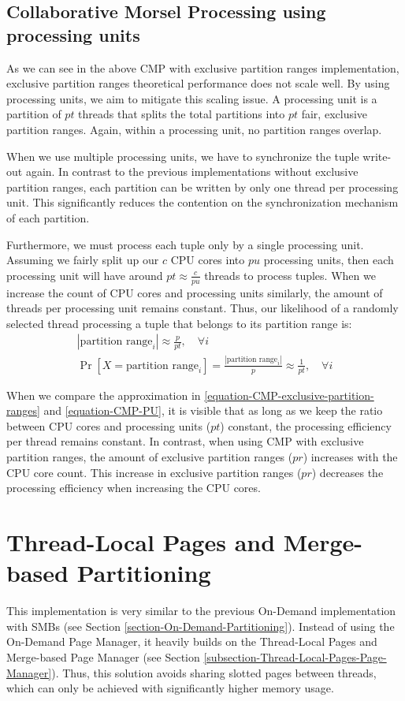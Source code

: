 \subsection{Collaborative Morsel Processing using processing units}
As we can see in the above \ac{CMP} with exclusive partition ranges implementation, exclusive partition ranges theoretical performance does not scale well.
By using processing units, we aim to mitigate this scaling issue.
A processing unit is a partition of $pt$ threads that splits the total partitions into $pt$ fair, exclusive partition ranges.
Again, within a processing unit, no partition ranges overlap.

When we use multiple processing units, we have to synchronize the tuple write-out again.
In contrast to the previous implementations without exclusive partition ranges, each partition can be written by only one thread per processing unit.
This significantly reduces the contention on the synchronization mechanism of each partition.

Furthermore, we must process each tuple only by a single processing unit.
Assuming we fairly split up our $c$ \ac{CPU} cores into $pu$ processing units, then each processing unit will have around $pt\approx\frac{c}{pu}$ threads to process tuples.
When we increase the count of CPU cores and processing units similarly, the amount of threads per processing unit remains constant.
Thus, our likelihood of a randomly selected thread processing a tuple that belongs to its partition range is:
\begin{gather}
  |\textrm{partition range}_i| \approx \frac{p}{pt},  \quad \forall i \\
  \Pr[X=\textrm{partition range}_i] = \frac{|\textrm{partition range}_i|}{p}\approx \frac{1}{pt} ,  \quad \forall i\label{equation-CMP-PU}
\end{gather}

When we compare the approximation in \ref{equation-CMP-exclusive-partition-ranges} and \ref{equation-CMP-PU}, it is visible that as long as we keep the ratio between CPU cores and processing units ($pt$) constant, the processing efficiency per thread remains constant.
In contrast, when using \acl{CMP} with exclusive partition ranges, the amount of exclusive partition ranges ($pr$) increases with the CPU core count.
This increase in exclusive partition ranges ($pr$) decreases the processing efficiency when increasing the CPU cores.

\section{Thread-Local Pages and Merge-based Partitioning}
This implementation is very similar to the previous On-Demand implementation with \aclp{SMB} (see Section \ref{section-On-Demand-Partitioning}).
Instead of using the On-Demand Page Manager, it heavily builds on the Thread-Local Pages and Merge-based Page Manager (see Section \ref{subsection-Thread-Local-Pages-Page-Manager}).
Thus, this solution avoids sharing slotted pages between threads, which can only be achieved with significantly higher memory usage.


